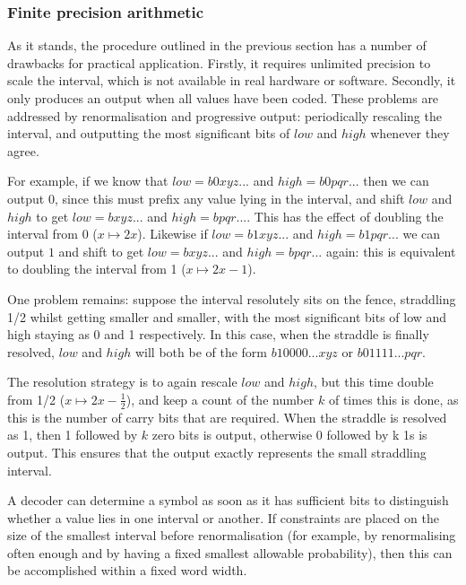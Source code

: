 \begin{informative*}
\subsubsection{Finite precision arithmetic}
As it stands, the procedure outlined in the previous section has a number of
drawbacks for practical application. Firstly, it requires unlimited precision
to scale the interval, which is not available in real hardware or software.
Secondly, it only produces an output when all values have been coded. These
problems are addressed by renormalisation and progressive output: periodically rescaling the
interval, and outputting the most significant bits of $low$ and $high$ whenever they agree.

For example, if we know that $low=b0xyz...$ and $high=b0pqr...$ then we can
output $0$, since this must prefix any value lying in the interval, 
and shift $low$ and $high$ to get $low=bxyz...$ and $high=bpqr...$.
This has the effect of doubling the interval from 0 ($x\mapsto 2x$). Likewise
if $low=b1xyz...$ and $high=b1pqr...$ we can output $1$ and shift to get
$low=bxyz...$ and $high=bpqr...$ again: this is equivalent to doubling the interval
from 1 ($x\mapsto 2x-1$).

One problem remains: suppose the interval resolutely sits on the fence, straddling
1/2 whilst getting smaller and smaller, with the most 
significant bits of low and high staying as 0 and 1 respectively. 
In this case, when the straddle is finally resolved, $low$ and $high$ will
both be of the form $b10000...xyz$ or $b01111...pqr$. 

The resolution strategy is to again rescale $low$ and $high$, but this time
double from 1/2 ($x\mapsto 2x-\frac{1}{2}$), and keep a count of the number $k$
of times this is done, as this is the number of carry bits that are
required. When the straddle is resolved as 1, then 1 followed by $k$ zero bits is 
output, otherwise 0 followed by k 1s is output. This ensures that the
output exactly represents the small straddling interval.

A decoder can determine a symbol as soon as it has sufficient bits to distinguish
whether a value lies in one interval or another. If constraints are placed on the
 size of the smallest interval before
renormalisation (for example, by renormalising often enough and by having a fixed
smallest allowable probability), then this can be accomplished within a fixed word width.


\end{informative*}
